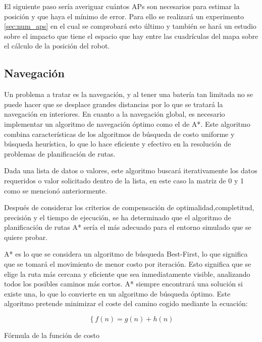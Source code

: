 El siguiente paso sería averiguar cuántos APs son necesarios para estimar la posición y que haya el mínimo de error. Para ello se realizará un experimento \ref{sec:num_aps} en el cual se comprobará esto último y también se hará un estudio sobre el impacto que tiene el espacio que hay entre las cuadrículas del mapa sobre el cálculo de la posición del robot.


\subsection{Navegación}
\label{subsec:navegación}

Un problema a tratar es la navegación, y al tener una batería tan limitada no se puede hacer que se desplace grandes distancias por lo que se tratará la navegación en interiores. En cuanto a la navegación global, es necesario implementar un algoritmo de navegación óptimo como el de A*. Este algoritmo combina características de los algoritmos de búsqueda de costo uniforme y búsqueda heurística, lo que lo hace eficiente y efectivo en la resolución de problemas de planificación de rutas. 

Dada una lista de datos o valores, este algoritmo buscará iterativamente los datos requeridos o
valor solicitado dentro de la lista, en este caso la matriz de 0 y 1 como se mencionó anteriormente. 

Después de considerar los criterios de compensación de optimalidad,completitud, precisión y el tiempo de ejecución, se ha determinado que el algoritmo de planificación de rutas A*
sería el más adecuado para el entorno simulado que se quiere probar. 


A* es lo que se considera un algoritmo de búsqueda Best-First, lo que significa que se tomará el movimiento de menor costo por iteración. Esto significa que se elige la ruta más cercana y eficiente que sea inmediatamente visible, analizando todos los posibles caminos más cortos. A* siempre encontrará una solución si existe una, lo que lo convierte en un algoritmo de búsqueda óptimo. Este algoritmo pretende minimizar el coste del camino cogido mediante la ecuación:


\begin{myequation}[H]
\begin{equation}
\left\{
	f(n) = g(n) + h(n)
\right.
\label{ec:ec6}
\end{equation}
\caption[Fórmula de la función de costo]{Fórmula de la función de costo}
\end{myequation}


